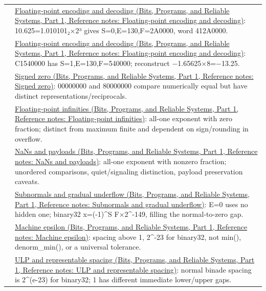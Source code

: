 {\begin{longtable}[]{@{}
  >{\raggedright\arraybackslash}p{}
  >{\raggedright\arraybackslash}p{}@{}}
67 & \href{../01-Bits-Programs-and-Reliable-Systems-P01/main.pdf\#appendix-6854d0e2218e}{Floating-point encoding and decoding (Bits, Programs, and Reliable Systems, Part 1, Reference notes: Floating-point encoding and decoding)}: 10.625=1.010101₂×2³ gives S=0,E=130,F=2A0000, word 412A0000. \\
68 & \href{../01-Bits-Programs-and-Reliable-Systems-P01/main.pdf\#appendix-6854d0e2218e}{Floating-point encoding and decoding (Bits, Programs, and Reliable Systems, Part 1, Reference notes: Floating-point encoding and decoding)}: C1540000 has S=1,E=130,F=540000; reconstruct −1.65625×8=−13.25. \\
69 & \href{../01-Bits-Programs-and-Reliable-Systems-P01/main.pdf\#appendix-3a048f032c1f}{Signed zero (Bits, Programs, and Reliable Systems, Part 1, Reference notes: Signed zero)}: 00000000 and 80000000 compare numerically equal but have distinct representations/reciprocals. \\
70 & \href{../01-Bits-Programs-and-Reliable-Systems-P01/main.pdf\#appendix-eb336149c00a}{Floating-point infinities (Bits, Programs, and Reliable Systems, Part 1, Reference notes: Floating-point infinities)}: all-one exponent with zero fraction; distinct from maximum finite and dependent on sign/rounding in overflow. \\
71 & \href{../01-Bits-Programs-and-Reliable-Systems-P01/main.pdf\#appendix-d6607cc4c235}{NaNs and payloads (Bits, Programs, and Reliable Systems, Part 1, Reference notes: NaNs and payloads)}: all-one exponent with nonzero fraction; unordered comparisons, quiet/signaling distinction, payload preservation caveats. \\
72 & \href{../01-Bits-Programs-and-Reliable-Systems-P01/main.pdf\#appendix-00a6e044c437}{Subnormals and gradual underflow (Bits, Programs, and Reliable Systems, Part 1, Reference notes: Subnormals and gradual underflow)}: E=0 uses no hidden one; binary32 x=(-1)\^{}S F×2\^{}-149, filling the normal-to-zero gap. \\
73 & \href{../01-Bits-Programs-and-Reliable-Systems-P01/main.pdf\#appendix-390ea641da54}{Machine epsilon (Bits, Programs, and Reliable Systems, Part 1, Reference notes: Machine epsilon)}: spacing above 1, 2\^{}-23 for binary32, not min(), denorm\_min(), or a universal tolerance. \\
74 & \href{../01-Bits-Programs-and-Reliable-Systems-P01/main.pdf\#appendix-14bab4cab9d4}{ULP and representable spacing (Bits, Programs, and Reliable Systems, Part 1, Reference notes: ULP and representable spacing)}: normal binade spacing is 2\^{}(e-23) for binary32; 1 has different immediate lower/upper gaps. \\

\end{longtable}}
